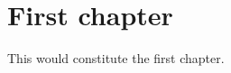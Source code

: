 \documentclass[../main.tex]{subfiles}
\begin{document}
\chapter{First chapter}

This would constitute the first chapter.
\end{document}
